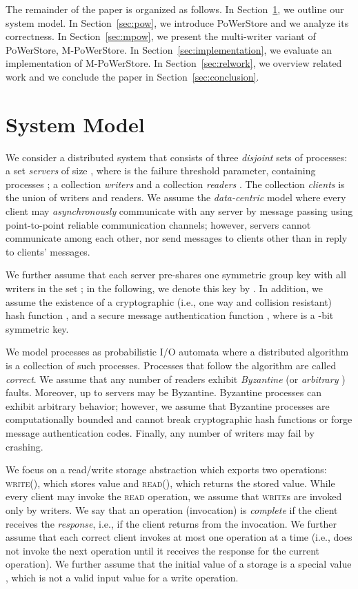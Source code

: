 \documentclass[10pt,conference,compsocconf]{IEEEtran}
\newcommand{\protocol}{PoWerStore}
\newcommand{\mprotocol}{M-PoWerStore}
\begin{document}
The remainder of the paper is organized as follows. In Section~\ref{sec:model}, we outline our system model. In Section~\ref{sec:pow}, we introduce \protocol{} and we analyze its correctness.
In Section~\ref{sec:mpow}, we present the multi-writer variant of \protocol, \mprotocol{}. In Section~\ref{sec:implementation}, we evaluate an implementation of \mprotocol{}. In Section~\ref{sec:relwork}, we overview related work and we conclude the paper in Section~\ref{sec:conclusion}.


\section{System Model}
\label{sec:model}

We consider a distributed system that consists of three \emph{disjoint}
sets of processes: a set \emph{servers} of size , where  is the failure threshold parameter, containing
processes ; a collection \emph{writers} 
and a collection \emph{readers} .
The collection \emph{clients} is the union of writers and readers.
We assume the \emph{data-centric} model \cite{CMD03,ChocklerGKV09,SMMK10} where every client may \emph{asynchronously} communicate with any server by message passing using point-to-point reliable
communication channels; however, servers cannot communicate
among each other, nor send messages to clients other
than in reply to clients' messages.

We further assume that each server  pre-shares one symmetric group key with all writers
in the set ; in the following, we denote this key by . In addition, we assume the existence of a cryptographic (i.e., one way and collision resistant) hash function , and a secure message authentication function , where  is a -bit symmetric key.


We model processes as probabilistic I/O automata \cite{WSS94} where a distributed algorithm is a collection of such processes. Processes that follow the algorithm are called \emph{correct}. We assume that any number of readers exhibit \emph{Byzantine} \cite{LSP82} (or \emph{arbitrary} \cite{JCT98}) faults. Moreover, up to  servers may be Byzantine. Byzantine processes can exhibit arbitrary behavior; however, we assume that Byzantine processes are computationally bounded and cannot break cryptographic hash functions or forge message authentication codes. Finally, any number of writers may fail by crashing.





We focus on a read/write storage abstraction \cite{Lam86} which exports two operations: \textsc{write}(), which stores value  and \textsc{read}(), which returns the stored value. While every client may invoke the \textsc{read} operation, we assume that \textsc{write}s are invoked only by writers. We say that an
operation (invocation)  is \emph{complete} if the client receives the \emph{response}, i.e., if the client returns from the invocation. We further assume that each correct client invokes at most one operation at a time (i.e., does not invoke the next operation
until it receives the response for the current operation).
We further assume that the initial value of a storage is a special value , which is not a
valid input value for a write operation.
\end{document}
